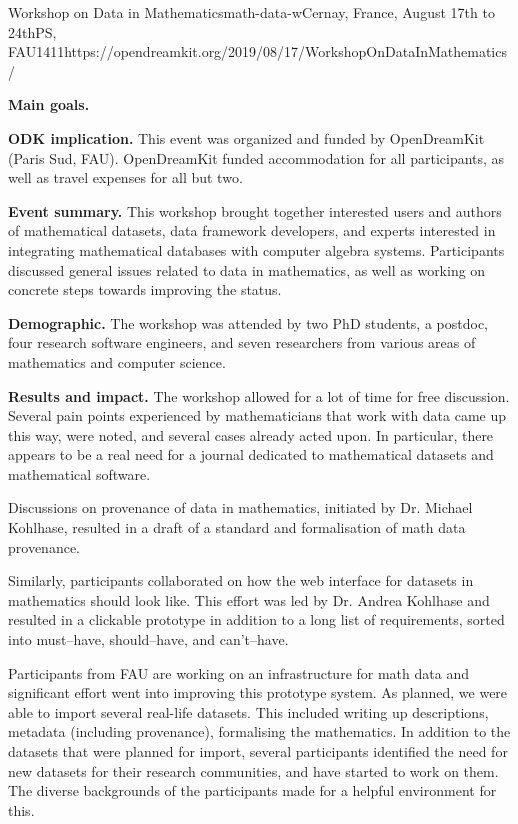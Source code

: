 \begin{event}{Workshop on Data in Mathematics}{math-data-w}{Cernay, France, August 17th to 24th}{PS, FAU}{14}{11}{https://opendreamkit.org/2019/08/17/WorkshopOnDataInMathematics/}

\textbf{Main goals.} 

\textbf{ODK implication.} This event was organized and funded by OpenDreamKit (Paris Sud, FAU). 
OpenDreamKit funded accommodation for all participants, as well as travel expenses for all but two.

\textbf{Event summary.} This workshop brought together interested users and authors of mathematical datasets, 
data framework developers, and experts interested in integrating mathematical databases with computer algebra systems.
Participants discussed general issues related to data in mathematics,
as well as working on concrete steps towards improving the status.

\textbf{Demographic.} The workshop was attended by 
two PhD students,
a postdoc,
four research software engineers,
and seven researchers from various areas of mathematics and computer science.

\textbf{Results and impact.} 
The workshop allowed for a lot of time for free discussion.
Several pain points experienced by mathematicians that work with data came up this way,
were noted, and several cases already acted upon.
In particular, there appears to be a real need for a journal dedicated to 
mathematical datasets and mathematical software.

Discussions on provenance of data in mathematics,
initiated by Dr. Michael Kohlhase, resulted in 
a draft of a standard and formalisation of math data provenance.

Similarly, participants collaborated on how the web interface
for datasets in mathematics should look like.
This effort was led by Dr. Andrea Kohlhase and resulted in 
a clickable prototype in addition to a long list of requirements,
sorted into must--have, should--have, and can't--have.

Participants from FAU are working on an infrastructure for math data and
significant effort went into improving this prototype system.
As planned, we were able to import several real-life datasets.
This included writing up descriptions, metadata (including provenance), 
formalising the mathematics.
In addition to the datasets that were planned for import,
several participants identified the need for new datasets for their 
research communities, and have started to work on them.
The diverse backgrounds of the participants made for a helpful
environment for this.


\end{event}
